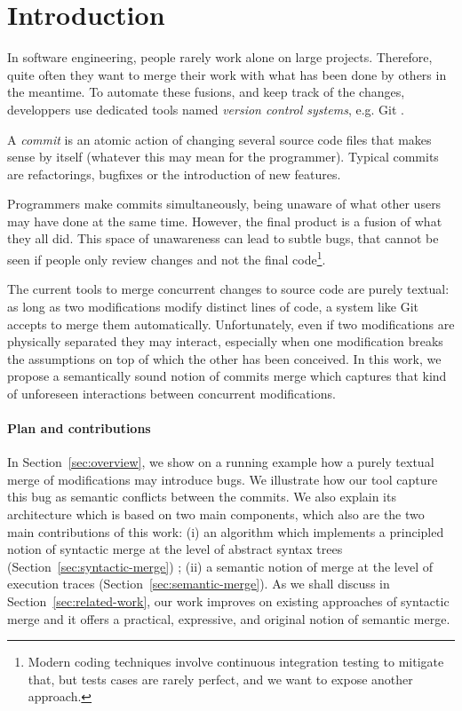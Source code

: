 \documentclass[a4paper,11pt]{article}
\newcommand\yrg[1]{{\color{red}{(YRG: #1)}}}
\begin{document}
\section*{Introduction}

In software engineering, people rarely work alone on large
projects. Therefore, quite often they want to merge their work with
what has been done by others in the meantime.
%
To automate these fusions, and keep track of the changes, developpers use
dedicated tools named \textit{version control systems}, e.g. Git \yrg{ref?}.

A \textit{commit} is an atomic action of changing several
source code files that makes sense by itself (whatever this may mean
for the programmer). Typical commits are refactorings, bugfixes or the
introduction of new features.

Programmers make commits simultaneously, being unaware of what other
users may have done at the same time. However, the final product is a
fusion of what they all did. This space of unawareness can lead to
subtle bugs, that cannot be seen if people only review changes and not
the final code\footnote{Modern coding techniques involve continuous
  integration testing to mitigate that, but tests cases are rarely
  perfect, and we want to expose another approach.}.

The current tools to merge concurrent changes to source code are
purely textual: as long as two modifications modify distinct lines of
code, a system like Git accepts to merge them
automatically. Unfortunately, even if two modifications are physically
separated they may interact, especially when one modification breaks
the assumptions on top of which the other has been conceived. In this
work, we propose a semantically sound notion of commits merge which
captures that kind of unforeseen interactions between concurrent
modifications.

\paragraph{Plan and contributions}
In Section~\ref{sec:overview}, we show on a running example how a
purely textual merge of modifications may introduce bugs. We
illustrate how our tool capture this bug as semantic conflicts between
the commits. We also explain its architecture which is based on two
main components, which also are the two main contributions of this
work: (i) an algorithm which implements a principled notion of
syntactic merge at the level of abstract syntax trees
(Section~\ref{sec:syntactic-merge}) ; (ii) a semantic notion of merge
at the level of execution traces (Section~\ref{sec:semantic-merge}).
As we shall discuss in Section~\ref{sec:related-work}, our work
improves on existing approaches of syntactic merge and it offers a
practical, expressive, and original notion of semantic merge.
\end{document}
